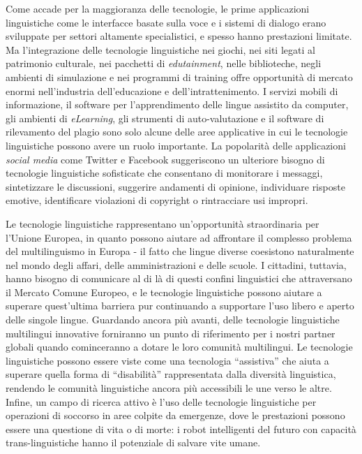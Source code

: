 \documentclass[]{../../metanetpaper}
\begin{document}
\begin{multicols}{2}
Come accade per la maggioranza delle tecnologie, le prime applicazioni
linguistiche come le interfacce basate sulla voce e i sistemi di dialogo erano
sviluppate per settori altamente specialistici, e spesso hanno prestazioni
limitate. Ma l'integrazione delle tecnologie linguistiche nei giochi, nei siti
legati al patrimonio culturale, nei pacchetti di \emph{edutainment}, nelle
biblioteche, negli ambienti di simulazione e nei programmi di training offre
opportunit\`{a} di mercato enormi nell'industria dell'educazione e
dell'intrattenimento.  I servizi mobili di informazione, il software per
l'apprendimento delle lingue assistito da computer, gli ambienti di
\emph{eLearning}, gli strumenti di auto-valutazione e il software di
rilevamento del plagio sono solo alcune delle aree applicative in cui le
tecnologie linguistiche possono avere un ruolo importante. La popolarit\`{a}
delle applicazioni \emph{social media} come Twitter e Facebook suggeriscono un
ulteriore bisogno di tecnologie linguistiche sofisticate che consentano di
monitorare i messaggi, sintetizzare le discussioni, suggerire andamenti di
opinione, individuare risposte emotive, identificare violazioni di copyright o
rintracciare usi impropri.






Le tecnologie linguistiche rappresentano un'opportunit\`{a} straordinaria per
l'Unione Europea, in quanto possono aiutare ad affrontare il complesso
problema del multilinguismo in Europa - il fatto che lingue diverse coesistono
naturalmente nel mondo degli affari, delle amministrazioni e delle scuole. I
cittadini, tuttavia, hanno bisogno di comunicare al di l\`{a} di questi
confini linguistici che attraversano il Mercato Comune Europeo, e le
tecnologie linguistiche possono aiutare a superare quest'ultima barriera pur
continuando a supportare l'uso libero e aperto delle singole lingue. Guardando
ancora pi\`{u} avanti, delle tecnologie linguistiche multilingui innovative
forniranno un punto di riferimento per i nostri partner globali quando
cominceranno a dotare le loro comunit\`{a} multilingui. Le tecnologie
linguistiche possono essere viste come una tecnologia “assistiva” che aiuta a
superare quella forma di “disabilit\`{a}” rappresentata dalla diversit\`{a}
linguistica, rendendo le comunit\`{a} linguistiche ancora pi\`{u} accessibili
le une verso le altre. Infine, un campo di ricerca attivo \`{e} l'uso delle
tecnologie linguistiche per operazioni di soccorso in aree colpite da
emergenze, dove le prestazioni possono essere una questione di vita o di
morte: i robot intelligenti del futuro con capacit\`{a} trans-linguistiche
hanno il potenziale di salvare vite umane.




\end{multicols}
\end{document}
